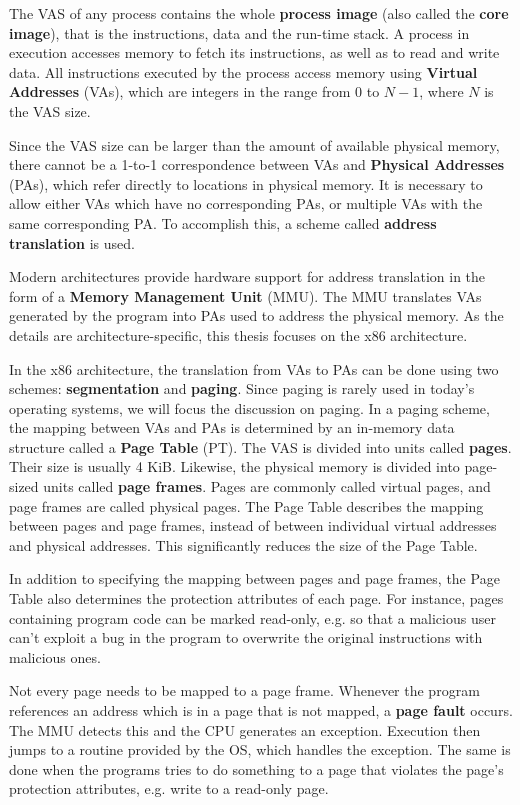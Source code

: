 \documentclass[shortabstract, english]{iithesis}
\begin{document}
The VAS of any process contains the whole \textbf{process image} (also called
the \textbf{core image}), that is the instructions, data and the run-time stack.
A process in execution accesses memory to fetch its instructions, as well as to
read and write data. All instructions executed by the process access memory
using \textbf{Virtual Addresses} (VAs), which are integers in the range from 0
to $N-1$, where $N$ is the VAS size.

Since the VAS size can be larger than the amount of available physical memory,
there cannot be a 1-to-1 correspondence between VAs and \textbf{Physical
  Addresses} (PAs), which refer directly to locations in physical memory. It is
necessary to allow either VAs which have no corresponding PAs, or multiple VAs
with the same corresponding PA. To accomplish this, a scheme called
\textbf{address translation} is used.

Modern architectures provide hardware support for address translation in the
form of a \textbf{Memory Management Unit} (MMU). The MMU translates VAs
generated by the program into PAs used to address the physical memory. As the
details are architecture-specific, this thesis focuses on the x86 architecture.

In the x86 architecture, the translation from VAs to PAs can be done using two
schemes: \textbf{segmentation} and \textbf{paging}. Since paging is rarely used
in today's operating systems, we will focus the discussion on paging. In a
paging scheme, the mapping between VAs and PAs is determined by an in-memory
data structure called a \textbf{Page Table} (PT). The VAS is divided into units
called \textbf{pages}. Their size is usually 4 KiB. Likewise, the physical
memory is divided into page-sized units called \textbf{page frames}. Pages are
commonly called virtual pages, and page frames are called physical pages. The
Page Table describes the mapping between pages and page frames, instead of
between individual virtual addresses and physical addresses. This significantly
reduces the size of the Page Table.

In addition to specifying the mapping between pages and page frames, the Page
Table also determines the protection attributes of each page. For instance,
pages containing program code can be marked read-only, e.g. so that a malicious
user can't exploit a bug in the program to overwrite the original instructions
with malicious ones.

Not every page needs to be mapped to a page frame. Whenever the program
references an address which is in a page that is not mapped, a \textbf{page
  fault} occurs. The MMU detects this and the CPU generates an exception.
Execution then jumps to a routine provided by the OS, which handles the
exception. The same is done when the programs tries to do something to a page
that violates the page's protection attributes, e.g. write to a read-only page.
\end{document}
